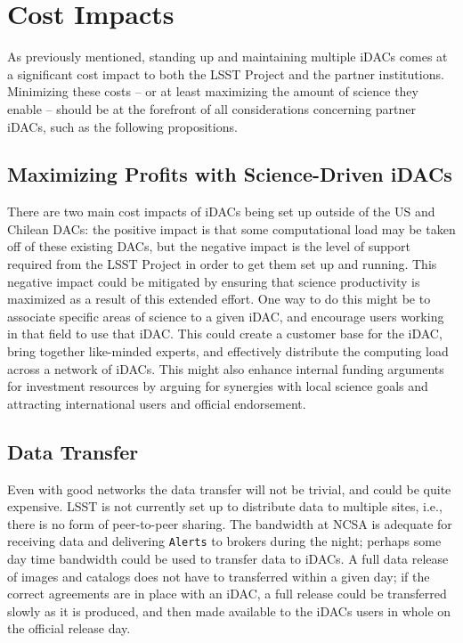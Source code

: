 \section{Cost Impacts}\label{sec:costs}

As previously mentioned, standing up and maintaining multiple iDACs comes at a significant cost impact to both the LSST Project and the partner institutions. Minimizing these costs -- or at least maximizing the amount of science they enable -- should be at the forefront of all considerations concerning partner iDACs, such as the following propositions.

\subsection{Maximizing Profits with Science-Driven iDACs}
There are two main cost impacts of iDACs being set up outside of the US and Chilean DACs: the positive impact is that some computational load may be taken off of these existing DACs, but the negative impact is the level of support required from the LSST Project in order to get them set up and running. This negative impact could be mitigated by ensuring that science productivity is maximized as a result of this extended effort. One way to do this might be to associate specific areas of science to a given iDAC, and encourage users working in that field to use that iDAC. This could create a customer base for the iDAC, bring together like-minded experts, and effectively distribute the computing load across a network of iDACs. This might also enhance internal funding arguments for investment resources by arguing for synergies with local science goals and attracting international users and official endorsement.

\subsection{Data Transfer}\label{sec:xfer}
Even with good networks the data transfer will not be trivial, and could be quite expensive. LSST is not currently set up to distribute data to multiple sites, i.e., there is no form of peer-to-peer sharing. The bandwidth at NCSA is adequate for receiving data and delivering {\tt Alerts} to brokers during the night; perhaps some day time bandwidth could be used to transfer data to iDACs. A full data release of images and catalogs does not have to transferred within a given day; if the correct agreements are in place with an iDAC, a full release could be transferred slowly as it is produced, and then made available to the iDACs users in whole on the official release day.


